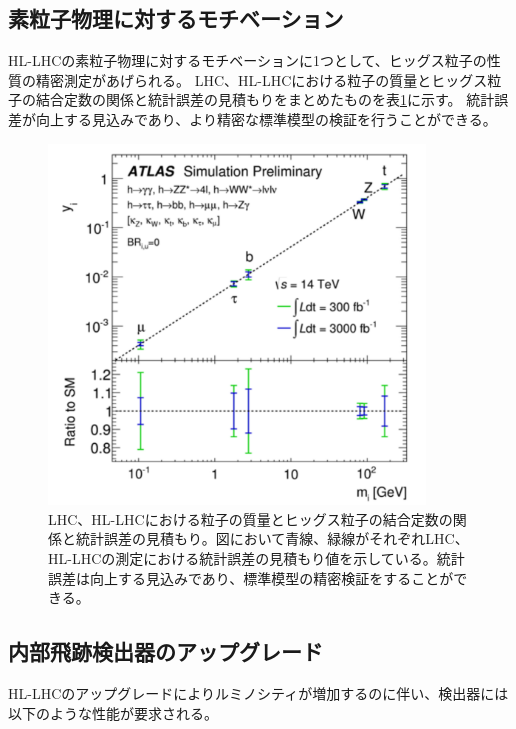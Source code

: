 \subsection{素粒子物理に対するモチベーション}
HL-LHCの素粒子物理に対するモチベーションに1つとして、ヒッグス粒子の性質の精密測定があげられる。
LHC、HL-LHCにおける粒子の質量とヒッグス粒子の結合定数の関係と統計誤差の見積もりをまとめたものを表\ref{higgs_uncertainty}に示す。
統計誤差が向上する見込みであり、より精密な標準模型の検証を行うことができる。

\begin{figure}[bpt]\centering
\includegraphics[width=10cm]{./higgs_uncertainty.pdf}
\caption[LHC、HL-LHCにおける粒子の質量とヒッグス粒子の結合定数の関係と統計誤差の見積もり]{LHC、HL-LHCにおける粒子の質量とヒッグス粒子の結合定数の関係と統計誤差の見積もり\cite{1-12}。図において青線、緑線がそれぞれLHC、HL-LHCの測定における統計誤差の見積もり値を示している。統計誤差は向上する見込みであり、標準模型の精密検証をすることができる。}
\label{higgs_uncertainty}
\end{figure}


\subsection{内部飛跡検出器のアップグレード}
HL-LHCのアップグレードによりルミノシティが増加するのに伴い、検出器には以下のような性能が要求される。

